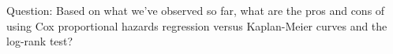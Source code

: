 \documentclass[10pt,t]{beamer}
\begin{document}
\begin{frame}
	\large
	Question: Based on what we've observed so far, what are the pros and cons of using Cox proportional hazards regression versus Kaplan-Meier curves and the log-rank test?
\end{frame}
%
%  
%
%
%
%	
%	
%
\end{document}
